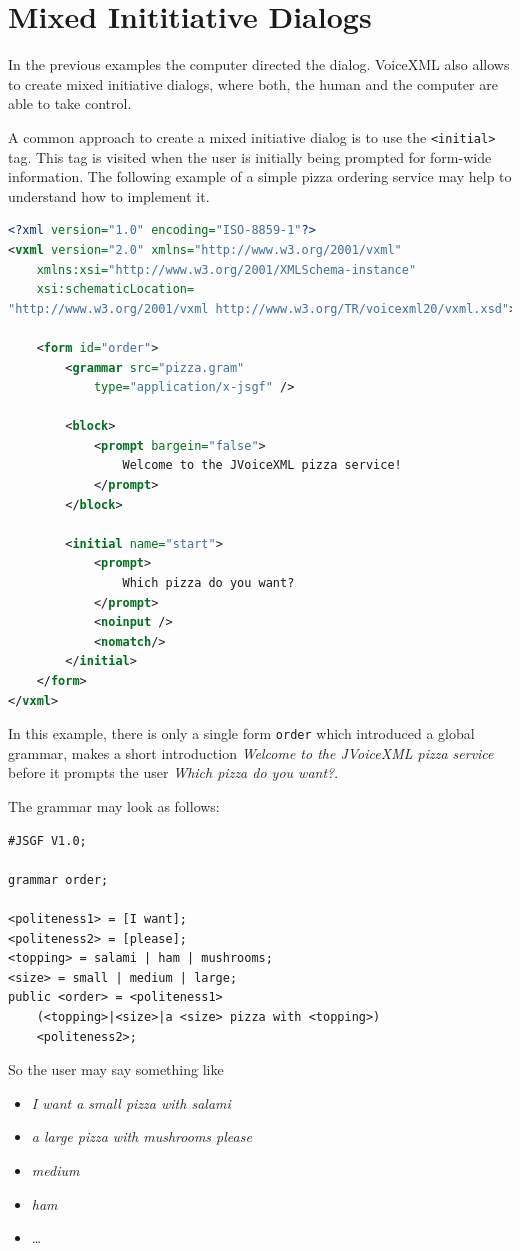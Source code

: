 \documentclass[11pt,a4paper]{book}
\begin{document}
\section{Mixed Inititiative Dialogs}

In the previous examples the computer directed the dialog. VoiceXML also allows
to create mixed initiative dialogs, where both, the human and the computer
are able to take control.

A common approach to create a mixed initiative dialog is to use the
\lstinline{<initial>} tag.
This tag is visited when the user is initially being prompted for form-wide
information.
The following example of a simple pizza ordering service may help to understand
how to implement it.

\begin{lstlisting}[language=XML]
<?xml version="1.0" encoding="ISO-8859-1"?>
<vxml version="2.0" xmlns="http://www.w3.org/2001/vxml"
    xmlns:xsi="http://www.w3.org/2001/XMLSchema-instance"
    xsi:schematicLocation=
"http://www.w3.org/2001/vxml http://www.w3.org/TR/voicexml20/vxml.xsd">

    <form id="order">
        <grammar src="pizza.gram"
            type="application/x-jsgf" />

        <block>
            <prompt bargein="false">
                Welcome to the JVoiceXML pizza service!
            </prompt>
        </block>

        <initial name="start">
            <prompt>
                Which pizza do you want?
            </prompt>
            <noinput />
            <nomatch/>
        </initial>
    </form>
</vxml>
\end{lstlisting}

In this example, there is only a single form \lstinline{order} which introduced
a global grammar, makes a short introduction \emph{Welcome to the JVoiceXML
pizza service} before it prompts the user \emph{Which pizza do you want?}.

The grammar may look as follows:
\begin{lstlisting}
#JSGF V1.0; 

grammar order;

<politeness1> = [I want];
<politeness2> = [please];
<topping> = salami | ham | mushrooms;
<size> = small | medium | large;
public <order> = <politeness1>
    (<topping>|<size>|a <size> pizza with <topping>)
    <politeness2>;
\end{lstlisting}

So the user may say something like
\begin{itemize}
  \item \emph{I want a small pizza with salami}
  \item \emph{a large pizza with mushrooms please}
  \item \emph{medium}
  \item \emph{ham}
  \item \ldots
\end{itemize}
\end{document}
